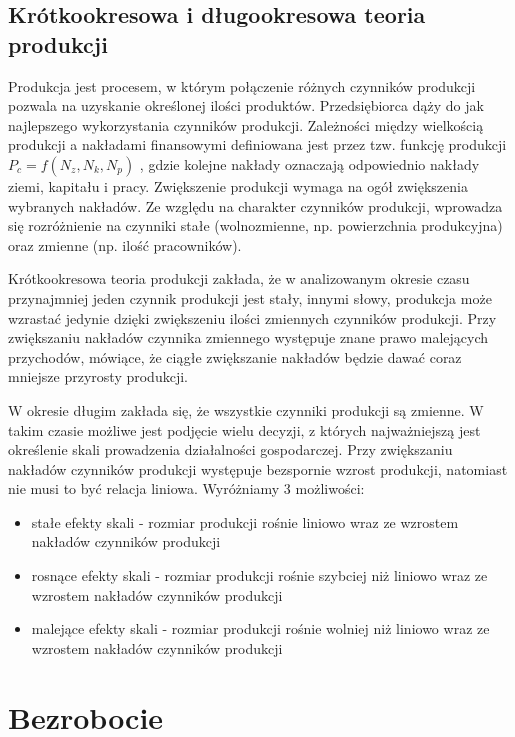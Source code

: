 \documentclass[12pt]{extarticle}
\begin{document}
\subsection{Krótkookresowa i długookresowa teoria produkcji}

Produkcja jest procesem, w którym połączenie różnych czynników produkcji pozwala na uzyskanie określonej ilości produktów. Przedsiębiorca dąży do jak najlepszego wykorzystania czynników produkcji. Zależności między wielkością produkcji a nakładami finansowymi definiowana jest przez tzw. funkcję produkcji $ P_c = f(N_z, N_k, N_p) $ , gdzie kolejne nakłady oznaczają odpowiednio nakłady ziemi, kapitału i pracy. Zwiększenie produkcji wymaga na ogół zwiększenia wybranych nakładów. Ze względu na charakter czynników produkcji, wprowadza się rozróżnienie na czynniki stałe (wolnozmienne, np. powierzchnia produkcyjna) oraz zmienne (np. ilość pracowników).

Krótkookresowa teoria produkcji zakłada, że w analizowanym okresie czasu przynajmniej jeden czynnik produkcji jest stały, innymi słowy, produkcja może wzrastać jedynie dzięki zwiększeniu ilości zmiennych czynników produkcji. Przy zwiększaniu nakładów czynnika zmiennego występuje znane prawo malejących przychodów, mówiące, że ciągłe zwiększanie nakładów będzie dawać coraz mniejsze przyrosty produkcji.

W okresie długim zakłada się, że wszystkie czynniki produkcji są zmienne. W takim czasie możliwe jest podjęcie wielu decyzji, z których najważniejszą jest określenie skali prowadzenia działalności gospodarczej. Przy zwiększaniu nakładów czynników produkcji występuje bezspornie wzrost produkcji, natomiast nie musi to być relacja liniowa. Wyróżniamy 3 możliwości:

\begin{itemize}
	\item stałe efekty skali - rozmiar produkcji rośnie liniowo wraz ze wzrostem nakładów czynników produkcji
	\item rosnące efekty skali - rozmiar produkcji rośnie szybciej niż liniowo wraz ze wzrostem nakładów czynników produkcji
	\item malejące efekty skali - rozmiar produkcji rośnie wolniej niż liniowo wraz ze wzrostem nakładów czynników produkcji
\end{itemize}

\section{Bezrobocie}
\end{document}
